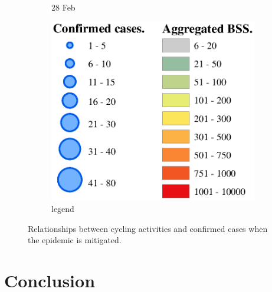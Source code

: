 \documentclass[preprints,ijgi,submit,moreauthors]{Definitions/mdpi}
\begin{document}
\begin{figure}[ht]
\begin{subfigure}{.3\textwidth}
        \caption{28 Feb}
    \end{subfigure}
    \begin{subfigure}{.3\textwidth}
        \includegraphics[width=\textwidth]{Figures/Relation_with_confrimed_cases/legend7.eps}
        \caption{legend}
    \end{subfigure}
    \caption{Relationships between cycling activities and confirmed cases when the epidemic is mitigated.}
    \label{fig:BSS_phase_3}
\end{figure}



\section{Conclusion}
\end{document}
